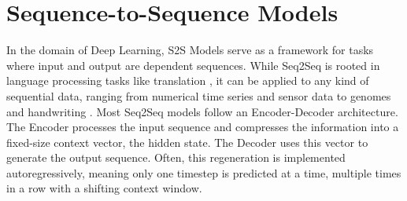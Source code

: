 \section{Sequence-to-Sequence Models}   


    In the domain of Deep Learning, \acf{S2S}  Models serve as a framework for tasks where input and output are dependent sequences. While \ac{Seq2Seq} is rooted in language processing tasks like translation \parencite{sutskever2014sequencesequencelearningneural}, it can be %
    applied to any kind of sequential data, ranging from numerical time series and sensor data to genomes and handwriting \parencite{gentleschmidt2019recurrentneuralnetworksrnns}. 
    Most \ac{Seq2Seq} models follow an Encoder-Decoder architecture. The 
    Encoder processes the input sequence and compresses the information into a fixed-size context vector, the hidden state. The Decoder uses this vector to generate the output sequence. Often, this regeneration is implemented autoregressively, meaning only one timestep is predicted at a time, multiple times in a row with a shifting context window.

